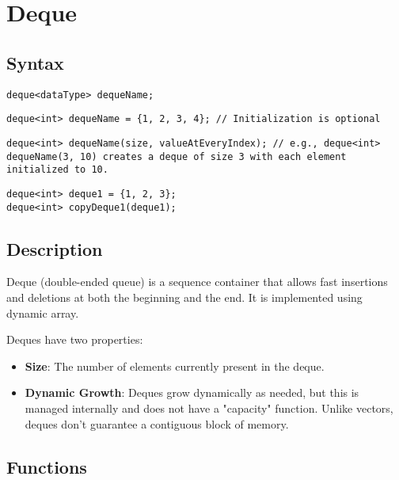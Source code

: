 \documentclass{article}
\begin{document}
\newpage
\section{Deque}

\subsection{Syntax}

\begin{lstlisting}
deque<dataType> dequeName; 
\end{lstlisting}

\begin{lstlisting}
deque<int> dequeName = {1, 2, 3, 4}; // Initialization is optional
\end{lstlisting}

\begin{lstlisting}
deque<int> dequeName(size, valueAtEveryIndex); // e.g., deque<int> dequeName(3, 10) creates a deque of size 3 with each element initialized to 10.
\end{lstlisting}

\begin{lstlisting}
deque<int> deque1 = {1, 2, 3};
deque<int> copyDeque1(deque1);
\end{lstlisting}

\subsection{Description}

Deque (double-ended queue) is a sequence container that allows fast insertions and deletions at both the beginning and the end. It is implemented using dynamic array.

\noindent Deques have two properties:
\begin{itemize}
    \item \textbf{Size}: The number of elements currently present in the deque.
    \item \textbf{Dynamic Growth}: Deques grow dynamically as needed, but this is managed internally and does not have a "capacity" function. Unlike vectors, deques don't guarantee a contiguous block of memory.
\end{itemize}

\subsection{Functions}
\end{document}

